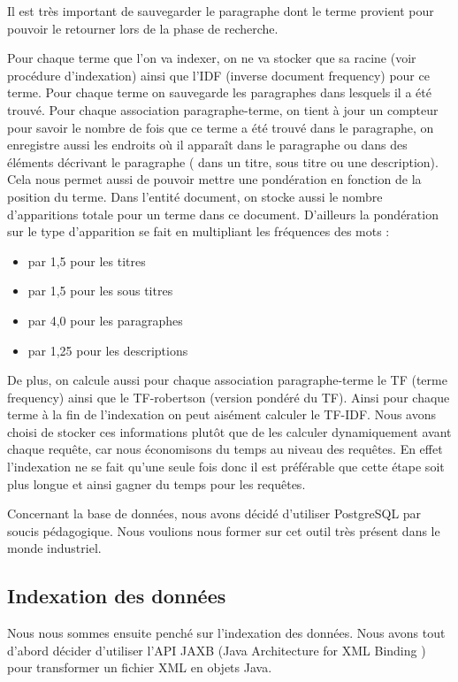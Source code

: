 \documentclass{article}
\begin{document}
Il est très important de sauvegarder le paragraphe dont le terme provient pour
pouvoir le retourner lors de la phase de recherche. 

Pour chaque terme que l’on va indexer, on ne va stocker que sa racine (voir procédure
d’indexation) ainsi que l’IDF (inverse document frequency) pour ce terme. Pour chaque
terme on sauvegarde les paragraphes dans lesquels il a été trouvé. Pour chaque
association paragraphe-terme, on tient à jour un compteur pour savoir le nombre de
fois que ce terme a été trouvé dans le paragraphe, on enregistre aussi les endroits
où il apparaît dans le paragraphe ou dans des éléments décrivant le paragraphe ( dans
un titre, sous titre ou une description). Cela nous permet aussi de pouvoir mettre
une pondération en fonction de la position du terme.  Dans l’entité document, on
stocke aussi le nombre d’apparitions totale pour un terme dans ce document.
D’ailleurs la pondération sur le type d’apparition se fait en multipliant les
fréquences des mots :

\begin{itemize}
    \item par 1,5 pour les titres
    \item par 1,5 pour les sous titres
    \item par 4,0 pour les paragraphes
    \item par 1,25 pour les descriptions
\end{itemize}

De plus, on calcule aussi pour chaque association paragraphe-terme le TF (terme
frequency) ainsi que le TF-robertson (version pondéré du TF). Ainsi pour chaque terme
à la fin de l’indexation on peut aisément calculer le TF-IDF. Nous avons choisi de
stocker ces informations plutôt que de les calculer dynamiquement avant chaque
requête, car nous économisons du temps au niveau des requêtes. En effet l’indexation
ne se fait qu’une seule fois donc il est préférable que cette étape soit plus longue
et ainsi gagner du temps pour les requêtes. 

Concernant la base de données, nous avons décidé d’utiliser PostgreSQL par soucis
pédagogique. Nous voulions nous former sur cet outil très présent dans le monde
industriel.

\subsection{Indexation des données}

Nous nous sommes ensuite penché sur l’indexation des données. Nous avons tout d’abord
décider d’utiliser l’API JAXB (Java Architecture for XML Binding )  pour transformer
un fichier XML en objets Java. 
\end{document}

